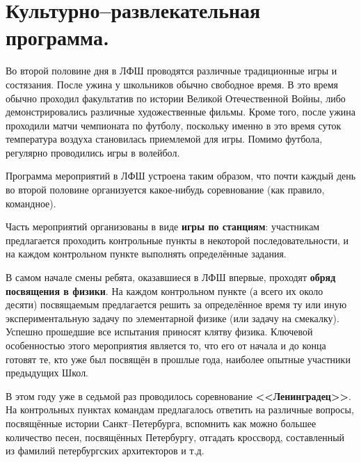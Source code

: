 \documentclass[12pt,a4paper,oneside]{scrartcl}
\newlength{\h}
\newlength{\x}
\begin{document}
\section{Культурно--развлекательная программа.}
\label{sec:fun}

Во второй половине дня в ЛФШ проводятся различные традиционные игры и
состязания. После ужина у школьников обычно свободное время. В это
время обычно проходил факультатив по истории Великой Отечественной
Войны, либо демонстрировались различные художественные фильмы. Кроме
того, после ужина проходили матчи чемпионата по футболу, поскольку
именно в это время суток температура воздуха становилась приемлемой
для игры. Помимо футбола, регулярно проводились игры в волейбол.

Программа мероприятий в ЛФШ устроена таким образом, что почти каждый
день во второй половине организуется какое-нибудь соревнование (как
правило, командное). 

Часть мероприятий организованы в виде \textbf{игры по станциям}:
участникам предлагается проходить контрольные пункты в некоторой
последовательности, и на каждом контрольном пункте выполнять
определённые задания.

В самом начале смены ребята, оказавшиеся в ЛФШ впервые, проходят
\textbf{обряд посвящения в физики}. На каждом контрольном пункте (а
всего их около десяти) посвящаемым предлагается решить за определённое
время ту или иную экспериментальную задачу по элементарной физике (или
задачу на смекалку). Успешно прошедшие все испытания приносят клятву
физика. Ключевой особенностью этого мероприятия является то, что его
от начала и до конца готовят те, кто уже был посвящён в прошлые года,
наиболее опытные участники предыдущих Школ.

\begin{figure}[h]
  \centering
  \hspace{0.05\textwidth}
\end{figure}


В этом году уже в седьмой раз проводилось соревнование
\textbf{<<Ленинградец>>}. На контрольных пунктах командам предлагалось
ответить на различные вопросы, посвящённые истории Санкт--Петербурга,
вспомнить как можно большее количество песен, посвящённых Петербургу,
отгадать кроссворд, составленный из фамилий петербургских архитекторов
и т.д.

\begin{figure}[h]
  \centering
  \hspace{0.05\textwidth}
\end{figure}
\end{document}
